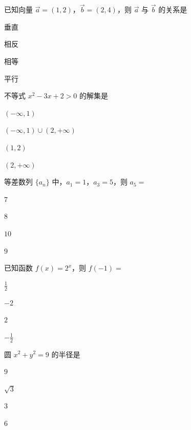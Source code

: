 \documentclass{exam-zh}
\begin{document}
\begin{question}
  已知向量 $\vec{a} = (1, 2)$，$\vec{b} = (2, 4)$，则 $\vec{a}$ 与 $\vec{b}$ 的关系是\paren[D]
  \begin{choices}
    \item 垂直
    \item 相反
    \item 相等
    \item 平行
  \end{choices}
\end{question}

\begin{question}
  不等式 $x^2 - 3x + 2 > 0$ 的解集是\paren[B]
  \begin{choices}
    \item $(-\infty, 1)$
    \item $(-\infty, 1) \cup (2, +\infty)$
    \item $(1, 2)$
    \item $(2, +\infty)$
  \end{choices}
\end{question}

\begin{question}
  等差数列 $\{a_n\}$ 中，$a_1 = 1$，$a_3 = 5$，则 $a_5 = $ \paren[D]
  \begin{choices}
    \item $7$
    \item $8$
    \item $10$
    \item $9$
  \end{choices}
\end{question}

\begin{question}
  已知函数 $f(x) = 2^x$，则 $f(-1) = $ \paren[A]
  \begin{choices}
    \item $\frac{1}{2}$
    \item $-2$
    \item $2$
    \item $-\frac{1}{2}$
  \end{choices}
\end{question}

\begin{question}
  圆 $x^2 + y^2 = 9$ 的半径是\paren[C]
  \begin{choices}
    \item $9$
    \item $\sqrt{3}$
    \item $3$
    \item $6$
  \end{choices}
\end{question}
\end{document}
